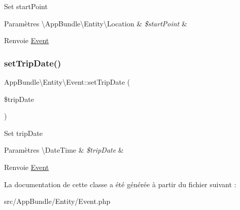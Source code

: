 Set start\+Point


\begin{DoxyParams}[1]{Paramètres}
\textbackslash{}\+App\+Bundle\textbackslash{}\+Entity\textbackslash{}\+Location & {\em \$start\+Point} & \\
\hline
\end{DoxyParams}
\begin{DoxyReturn}{Renvoie}
\hyperlink{classAppBundle_1_1Entity_1_1Event}{Event} 
\end{DoxyReturn}
\mbox{\label{classAppBundle_1_1Entity_1_1Event_ac0c53f2704cbff828187476552eab6a5}} 
\subsubsection{\texorpdfstring{set\+Trip\+Date()}{setTripDate()}}
{\footnotesize\ttfamily App\+Bundle\textbackslash{}\+Entity\textbackslash{}\+Event\+::set\+Trip\+Date (\begin{DoxyParamCaption}\item[{}]{\$trip\+Date }\end{DoxyParamCaption})}

Set trip\+Date


\begin{DoxyParams}[1]{Paramètres}
\textbackslash{}\+Date\+Time & {\em \$trip\+Date} & \\
\hline
\end{DoxyParams}
\begin{DoxyReturn}{Renvoie}
\hyperlink{classAppBundle_1_1Entity_1_1Event}{Event} 
\end{DoxyReturn}


La documentation de cette classe a été générée à partir du fichier suivant \+:\begin{DoxyCompactItemize}
\item 
src/\+App\+Bundle/\+Entity/Event.\+php\end{DoxyCompactItemize}
